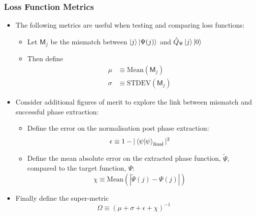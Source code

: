 \documentclass{beamer}
\begin{document}
\begin{frame}
\frametitle{Loss Function Metrics}
\begin{itemize}
\item The following metrics are useful when testing and comparing loss functions:
\begin{itemize}
\item Let $\mathsf{M}_j$ be the \alert{mismatch} between $\ket{j} \ket{\Psi(j)}$ and $\hat{Q}_\Psi \ket{j}\ket{0}$
\item Then define 
\begin{align}
\mu &\equiv \text{Mean}(\mathsf{M}_j) \\
\sigma &\equiv \text{STDEV}(\mathsf{M}_j)
\end{align}
\end{itemize}
\item Consider additional figures of merit to explore the \alert{link between mismatch and successful phase extraction}:
\begin{itemize}
\item Define the \alert{error on the normalisation} post phase extraction: 
\begin{equation}
\epsilon \equiv 1 - |\braket{\psi | \psi}_\text{final}|^2 
\end{equation}
\item Define the mean absolute \alert{error on the extracted phase function}, $\tilde{\Psi}$, compared to the target function, $\Psi$: 
\begin{equation}
\chi \equiv \text{Mean}(|\tilde{\Psi}(j) - \Psi(j)|)
\end{equation}
\end{itemize}
\item Finally define the \alert{super-metric} 
\begin{equation}
\Omega \equiv \left( \mu + \sigma + \epsilon + \chi \right)^{-1}
\end{equation}
\end{itemize}
\end{frame}
\end{document}
